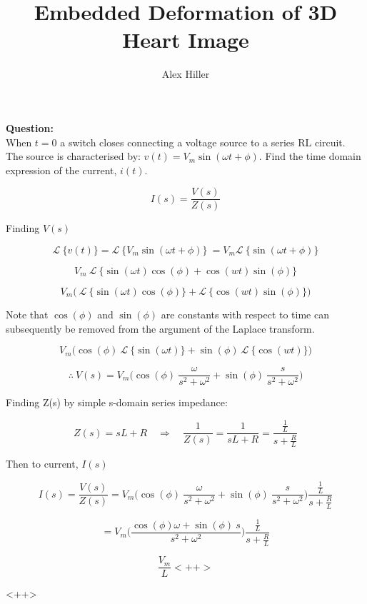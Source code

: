 \documentclass{article}
\author{Alex Hiller}
\title{Embedded Deformation of 3D Heart Image}
\newcommand{\Lapl}[1]{\mathcal{L} \ \bigg\{ #1  \bigg\}  }
\begin{document}
\textbf{Question:} \\
When $t=0$ a switch closes connecting a voltage source to a series RL circuit. The source is characterised by: $v(t) = V_m \sin(\omega t + \phi)$. Find the time domain expression of the current, $i(t)$.

\begin{equation}
  I(s) = \frac{V(s)}{Z(s)}
\end{equation}

Finding $V(s)$ 

\begin{equation}
  \Lapl{v(t)} =
  \Lapl{ V_m \sin(\omega t + \phi) } \ =
  V_m \Lapl{ \sin(\omega t + \phi) } 
\end{equation}

\begin{equation}
  V_m \ \Lapl{\sin(\omega t)\cos(\phi) +
  \cos(wt)\sin(\phi)}
\end{equation}

\begin{equation}
  V_m  \bigg( \ \Lapl{\sin(\omega t)\cos(\phi)} +
  \Lapl{\cos(wt)\sin(\phi)} \bigg)
\end{equation}

Note that $\cos(\phi)$ and $\sin(\phi)$ are constants with respect to time can subsequently be removed from the argument of the Laplace transform.

\begin{equation}
   V_m  \bigg( \cos(\phi) \ \Lapl{\sin(\omega t)} +
   \sin(\phi) \ \Lapl{\cos(wt)} \bigg)
\end{equation}

\begin{equation}
  \therefore \ V(s) = 
  V_m  \bigg( \cos(\phi) \ \frac{\omega}{s^2 +
  \omega^2}  +
  \sin(\phi) \ \frac{s}{s^2+\omega^2} \bigg)
\end{equation}

Finding Z(s) by simple s-domain series impedance:

\begin{equation}
  Z(s) =
  sL + R \quad \Rightarrow \quad \frac{1}{Z(s)} =
  \frac{1}{sL + R} =
  \frac{\frac{1}{L}}{s+\frac{R}{L}}
\end{equation}

Then to current, $I(s)$ 

\begin{equation}
  I(s) = 
  \frac{V(s)}{Z(s)} =  
  V_m  \bigg( \cos(\phi) \ \frac{\omega}{s^2 + 
  \omega^2}  + \sin(\phi) \ \frac{s}{s^2+\omega^2} \bigg) \frac{\frac{1}{L}}{s+\frac{R}{L}}
\end{equation}

\begin{equation}
   =  V_m  \bigg(  \frac{\cos(\phi) \omega + 
   \sin(\phi) \ s}{s^2 + \omega^2} \bigg) \frac{\frac{1}{L}}{s+\frac{R}{L}}
\end{equation}

\begin{equation}
  \frac{V_m}{L}<++>
\end{equation}



<++>
\end{document}
